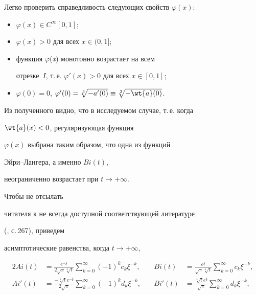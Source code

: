 Легко проверить справедливость следующих свойств $\varphi (x)$:


\begin{itemize}


\item[1)] $\varphi(x) \in C^{\infty }[ 0,1]$;


\item[2)] $\varphi(x)> 0$ для всех $ x \in (0,1 ]$;


\item[3)] функция $\varphi $({\it x}) монотонно возрастает на всем


отрезке~$I$, т.\,е. $\varphi'(x)>0$ для всех $x\in [0,1]$;


\item[4)] $\varphi(0)=0$, $\varphi'(0)


=\sqrt[{3}]{{-a}'(0)} \equiv \sqrt[{3}]{-\wt {a}(0)}$.


\end{itemize}





Из полученного видно, что в исследуемом случае, т.\,е. когда


$\wt{a} ({x}) < 0$, регуляризующая функция


$\varphi(x)$ выбрана таким образом, что одна из функций


Эйри--Лангера, а именно $Bi ({t})$,


неограниченно возрастает при $t \to + \infty $.





Чтобы не отсылать


читателя к не всегда доступной соответствующей литературе


(\cite{Sprav}, с.\,267), приведем 


асимптотические равенства, когда $t \to + \infty $,


\begin{alignat}{2}


\label{1.6}


Ai(t) &= \frac{{e^{ - \xi }}}{{2\sqrt {\pi


}\sqrt[{4}]{{t}}}}\sum_{k = 0}^{\infty }(-1)^k


{c_{k}\xi ^{ - k}}, &\quad Bi(t) &= \frac{{e^{\xi


}}}{{\sqrt {\pi }\sqrt[{4}]{{t}}}}\sum_{k = 0}^{\infty


}{c_{k} \xi ^{ - k}}, \\


%


\label{1.7}


Ai'(t) &= \frac{- \sqrt[{4}]{t}e^{- \xi }}{2\sqrt {\pi


}}\sum_{k = 0}^{\infty }(-1)^k d_{k}\xi ^{ - k},


&\quad Bi'(t) &= \frac{\sqrt[{4}]{{t}} e^{\xi }}{\sqrt


{\pi }}\sum_{k = 0}^{\infty } d_{k} \xi ^{ - k},


\end{alignat}


